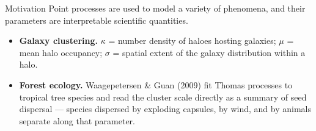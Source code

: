 \documentclass[aspectratio=169,10pt]{beamer}
\begin{document}
\begin{frame}{Motivation}
Point processes are used to model a variety of phenomena, and
their parameters are interpretable scientific quantities.
\vspace{6pt}
\begin{itemize}
  \item \textbf{Galaxy clustering.} $\kappa$ = number density of haloes hosting
        galaxies; $\mu$ = mean halo occupancy; $\sigma$ = spatial extent of the
        galaxy distribution within a halo.
  \item \textbf{Forest ecology.} Waagepetersen \& Guan (2009) fit Thomas
        processes to tropical tree species and read the cluster scale directly
        as a summary of seed dispersal --- species dispersed by exploding
        capsules, by wind, and by animals separate along that parameter.
\end{itemize}
\vspace{10pt}
\begin{center}
\end{center}
\end{frame}

\end{document}
